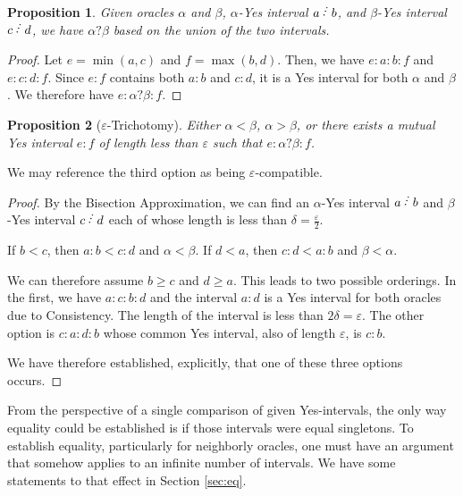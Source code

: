 \documentclass[12pt]{article}
\newtheorem{proposition}{Proposition}[subsection]
\begin{document}
\begin{proposition}
    Given oracles $\alpha$ and $\beta$,  $\alpha$-Yes interval $a\lte b$, and $\beta$-Yes interval $c\lte d$, we have $\alpha ? \beta$ based on the union of the two intervals.  
\end{proposition}

\begin{proof}
Let $e= \min(a,c)$ and $f = \max(b,d)$. Then, we have $e:a:b:f$ and $e:c:d:f$. Since $e:f$ contains both $a:b$ and $c:d$, it is a Yes interval for both $\alpha$ and $\beta$. We therefore have $e:\alpha?\beta:f$.
\end{proof}

\begin{proposition}[$\varepsilon$-Trichotomy]\label{pr:tri}
Either $\alpha < \beta$,  $\alpha > \beta$, or there exists a mutual Yes interval $e:f$ of length less than $\varepsilon$ such that $e: \alpha ? \beta : f$.
\end{proposition}

We may reference the third option as being $\varepsilon$-compatible.

\begin{proof}
    By the Bisection Approximation, we can find an $\alpha$-Yes interval $a \lte b$ and $\beta$-Yes interval $c \lte d$ each of whose length is less than $\delta = \frac{\varepsilon}{2}$. 

     If $b < c$, then $a:b < c:d$ and $\alpha < \beta$. If $d < a$, then $c:d < a:b$ and $\beta < \alpha$. 


     We can therefore assume $b \geq c$ and $d \geq a$. This leads to two possible orderings. In the first, we have $a:c:b:d$ and the interval $a:d$ is a Yes interval for both oracles due to Consistency. The length of the interval is less than $2 \delta = \varepsilon$. The other option is $c:a:d:b$ whose common Yes interval, also of length $\varepsilon$, is $c:b$. 

     We have therefore established, explicitly, that one of these three options occurs. 
     
\end{proof}

From the perspective of a single comparison of given Yes-intervals, the only way equality could be established is if those intervals were equal singletons. To establish equality, particularly for neighborly oracles, one must have an argument that somehow applies to an infinite number of intervals. We have some statements to that effect in Section \ref{sec:eq}. 
\end{document}
